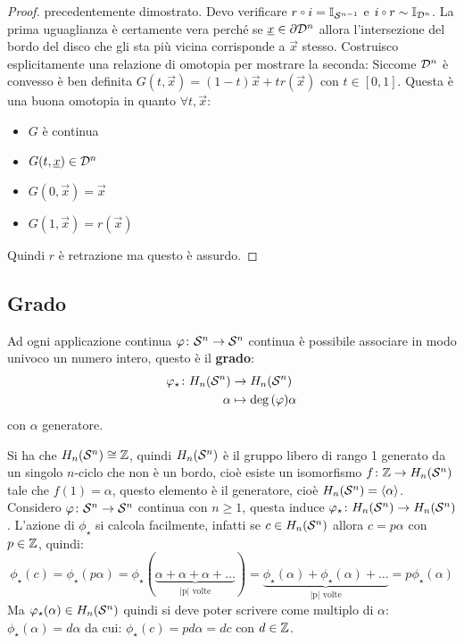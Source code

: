 \begin{proof}
  precedentemente dimostrato.
  Devo verificare $ r \circ i = \Id{\Sph{n-1}} $ e $ i \circ r \sim \Id{\Disk{n}} $.
  La prima uguaglianza è certamente vera perché se $ \underline{x} \in \partial \mathcal{D}^{n} $
  allora l'intersezione del bordo del disco che gli sta più vicina corrisponde a
  $ \vec{x} $ stesso.
  Costruisco esplicitamente una relazione di omotopia per mostrare la seconda:
  Siccome $ \mathcal{D}^{n} $ è convesso è ben definita $ G(t, \vec{x}) = (1-t)\vec{x}
  + t r(\vec{x}) $ con $ t \in [0,1] $. Questa è una buona omotopia in quanto $ \forall t, \vec{x} $:
  \begin{itemize}
  \item $ G $ è continua
  \item $ G(t, \underline{x}) \in \mathcal{D}^{n} $
  \item $ G(0, \vec{x}) = \vec{x} $
  \item $ G(1, \vec{x}) = r(\vec{x}) $
  \end{itemize}
  Quindi $ r $ è retrazione ma questo è assurdo.
\end{proof}


\subsection{Grado}
\begin{definition}
  Ad ogni applicazione continua $ \varphi \colon \mathcal{S}^{n} \to \mathcal{S}^{n} $ continua è possibile
  associare in modo univoco un numero intero, questo è il \textbf{grado}:
  \begin{align*}
    \varphi_\star \colon H_n(\mathcal{S}^{n}) & \to H_n(\mathcal{S}^{n}) \\
    \alpha & \mapsto  \deg{(\varphi)} \alpha
  \end{align*}
  con $ \alpha $ generatore.
\end{definition}

Si ha che $ H_n(\mathcal{S}^{n}) \cong \mathbb{Z} $, quindi $ H_n(\mathcal{S}^{n}) $ è il gruppo libero di
rango 1 generato da un singolo $ n $-ciclo che non è un bordo, cioè esiste un
isomorfismo $ f \colon \mathbb{Z} \to H_n(\mathcal{S}^{n}) $ tale che $ f(1) = \alpha $, questo elemento è
il generatore, cioè $ H_n(\mathcal{S}^{n}) = \langle\alpha\rangle $. Considero
$ \varphi \colon \mathcal{S}^{n} \to \mathcal{S}^{n} $ continua con $ n \geq 1 $, questa induce
$ \varphi_\star \colon H_n(\mathcal{S}^{n}) \to H_n(\mathcal{S}^{n}) $.
L'azione di $ \phi_\star $ si calcola facilmente, infatti se $ c \in H_n(\mathcal{S}^{n}) $
allora $ c = p \alpha $ con $ p \in \mathbb{Z} $, quindi:
\[
  \phi_\star (c) = \phi_\star (p \alpha) = \phi_\star (\underbrace{\alpha + \alpha + \alpha + \dots}_{\text{|p| volte}}) =
  \underbrace{\phi_\star (\alpha) + \phi_\star (\alpha) + \dots}_{\text{|p| volte}} = p \phi_\star(\alpha)
\]
Ma $ \varphi_\star(\alpha) \in H_n(\mathcal{S}^{n}) $ quindi si deve poter scrivere come multiplo di $ \alpha $:
$ \phi_\star (\alpha) = d \alpha $ da cui: $ \phi_\star (c) = p d \alpha = d c $ con $ d \in \mathbb{Z} $.

